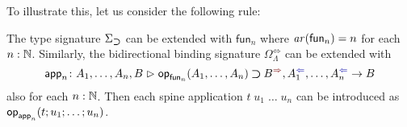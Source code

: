 To illustrate this, let us consider the following rule:
\bgroup
\small
  \begin{mathpar}
  \end{mathpar}
\egroup
The type signature $\Sigma_{\bto}$ can be extended with $\mathsf{fun}_n$ where $\arity({\mathsf{fun}_n}) = n$ for each $n : \N$.
Similarly, the bidirectional binding signature $\Omega_{\Lambda}^{\Leftrightarrow}$ can be extended with 
\[
  \aritysymbol{\mathsf{app}_n}{A_1,\ldots, A_n, B}{\tyOp_{\mathsf{fun}_n}(A_1, \ldots, A_n) \bto B^{\syn}, A_1^{\chk}, \ldots, A_n^{\chk}}{B}
\]
also for each $n : \N$.
Then each spine application $t\;u_1\;\ldots\;u_n$ can be introduced as $\tmOp_{\mathsf{app}_n}(t; u_1; \ldots; u_n)$.
